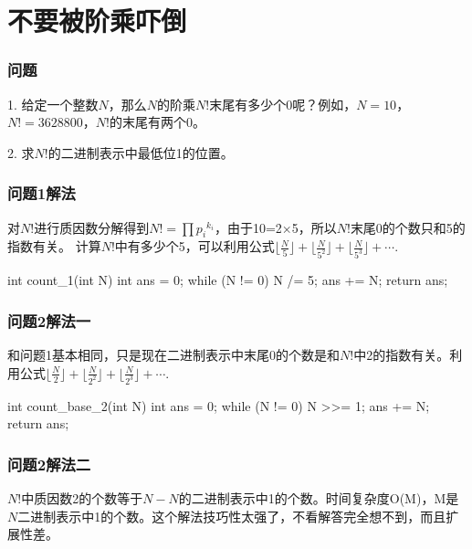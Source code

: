 \section{不要被阶乘吓倒} %
\label{sec:factorial-zeros}

\subsubsection{问题}
1. 给定一个整数$N$，那么$N$的阶乘$N!$末尾有多少个0呢？例如，$N=10$，$N!=3628800$，$N!$的末尾有两个0。

2. 求$N!$的二进制表示中最低位1的位置。

\subsubsection{问题1解法}
对$N!$进行质因数分解得到$N!=\prod {p_i}^{k_i}$，由于10=2×5，所以$N!$末尾0的个数只和5的指数有关。
计算$N!$中有多少个5，可以利用公式$\lfloor\frac{N}{5}\rfloor+\lfloor\frac{N}{5^2}\rfloor+\lfloor\frac{N}{5^3}\rfloor+\cdots$.
\begin{Codex}[label={[$O(log5(N))+O(1)$]Chap02_02_Factorial.java}]
	int count_1(int N) {
		int ans = 0;
		while (N != 0) {
			N /= 5;
			ans += N;
		}
		return ans;
	}
\end{Codex}

\subsubsection{问题2解法一}
和问题1基本相同，只是现在二进制表示中末尾0的个数是和$N!$中2的指数有关。利用公式$\lfloor\frac{N}{2}\rfloor+\lfloor\frac{N}{2^2}\rfloor+\lfloor\frac{N}{2^3}\rfloor+\cdots$.
\begin{Codex}[label={[$O(lg(N))+O(1)$]Chap02_02_Factorial.java}]
	int count_base_2(int N) {
		int ans = 0;
		while (N != 0) {
			N >>= 1;
			ans += N;
		}
		return ans;
	}
\end{Codex}

\subsubsection{问题2解法二}
$N!$中质因数2的个数等于$N-N$的二进制表示中1的个数。时间复杂度O(M)，M是$N$二进制表示中1的个数。这个解法技巧性太强了，不看解答完全想不到，而且扩展性差。

